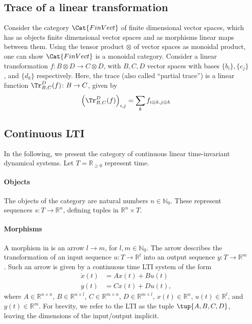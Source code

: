 \subsection{Trace of a linear transformation}
Consider the category $\Cat{FinVect}$ of finite dimensional vector spaces, which has as objects finite dimensional vector spaces and as morphisms linear maps between them. Using the tensor product $\otimes$ of vector spaces as monoidal product, one can show $\Cat{FinVect}$ is a monoidal category. Consider a linear transformation $f\colon B\otimes D\to C\otimes D$, with $B,C,D$ vector spaces with bases $\{b_i\},\{c_j\}$, and $\{d_k\}$ respectively. Here, the trace (also called ``partial trace'') is a linear function $\Tr_{B,C}
^D(f)\colon B\to C$, given by
    \begin{equation}
    \left(\Tr_{B,C}
^D(f) \right)_{i,j}=\sum_{k}f_{i\otimes k,j\otimes k}
    \end{equation}
\subsection{Continuous LTI}
In the following, we present the category of continuous linear time-invariant dynamical systems. Let $T=\mathbb{R}_{\geq 0}$ represent time.

\paragraph{Objects} The objects of the category are natural numbers $n\in \mathbb{N}_0$. These represent sequences $s\colon T\to \mathbb{R}^n$, defining tuples in $\mathbb{R}^n\times T$.

\paragraph{Morphisms} A morphism in  is an arrow $l\to m$, for $l,m\in \mathbb{N}_0$. The arrow describes the transformation of an input sequence $u\colon T\to \mathbb{R}^l$ into an output sequence $y\colon T\to \mathbb{R}^m$. Such an arrow is given by a continuous time LTI system of the form
\begin{equation}
\begin{aligned}
    \dot{x}(t)&=Ax(t)+Bu(t)\\
    y(t)&=Cx(t)+Du(t),
\end{aligned}
\end{equation}
where $A\in \mathbb{R}^{n\times n}$, $B\in \mathbb{R}^{n\times l}$, $C\in \mathbb{R}^{m\times n}$, $D\in \mathbb{R}^{m\times l}$, $x(t)\in \mathbb{R}^n$, $u(t)\in \mathbb{R}^l$, and $y(t)\in \mathbb{R}^m$. For brevity, we refer to the LTI as the tuple $\tup{A,B,C,D}$, leaving the dimensions of the input/output implicit.

